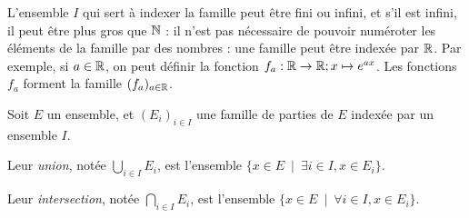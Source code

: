 L'ensemble $I$ qui sert à indexer la famille peut être fini ou infini, et s'il est infini, il peut être plus gros que $\mathbb{N}$ : il n'est pas nécessaire de pouvoir numéroter les éléments de la famille par des nombres : une famille peut être indexée par $\mathbb{R}$. Par exemple, si $a\in \mathbb{R}$, on peut définir la fonction $f_a : \mathbb{R}\to \mathbb{R}; x\mapsto e^{ax}$. Les fonctions $f_a$ forment la famille $(f_a)_{a\in \mathbb{R}}$.


\begin{definition}
Soit $E$ un ensemble, et $(E_i)_{i\in I}$ une famille de parties de $E$ indexée par un ensemble $I$.

Leur \emph{union}, notée $\bigcup_{i\in I} E_i$, est l'ensemble $\{x\in E\:\mid\: \exists i\in I, x\in E_i\}$.

Leur \emph{intersection}, notée $\bigcap_{i\in I} E_i$, est l'ensemble $\{x\in E\:\mid\: \forall i\in I, x\in E_i\}$.
\end{definition}

